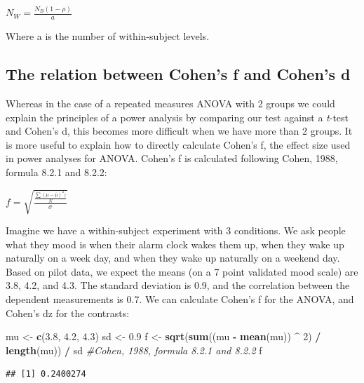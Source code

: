 \documentclass[]{book}
\newenvironment{Shaded}{\begin{snugshade}}{\end{snugshade}}
\newcommand{\CommentTok}[1]{\textcolor[rgb]{0.56,0.35,0.01}{\textit{#1}}}
\newcommand{\DecValTok}[1]{\textcolor[rgb]{0.00,0.00,0.81}{#1}}
\newcommand{\FloatTok}[1]{\textcolor[rgb]{0.00,0.00,0.81}{#1}}
\newcommand{\KeywordTok}[1]{\textcolor[rgb]{0.13,0.29,0.53}{\textbf{#1}}}
\newcommand{\NormalTok}[1]{#1}
\newcommand{\OperatorTok}[1]{\textcolor[rgb]{0.81,0.36,0.00}{\textbf{#1}}}
\newcommand{\StringTok}[1]{\textcolor[rgb]{0.31,0.60,0.02}{#1}}
\begin{document}
\(N_{W}=\frac{N_{B}(1-\rho)}{a}\)

Where a is the number of within-subject levels.

\hypertarget{the-relation-between-cohens-f-and-cohens-d}{%
\subsection{The relation between Cohen's f and Cohen's d}\label{the-relation-between-cohens-f-and-cohens-d}}

Whereas in the case of a repeated measures ANOVA with 2 groups we could explain the principles of a power analysis by comparing our test against a \emph{t}-test and Cohen's d, this becomes more difficult when we have more than 2 groups. It is more useful to explain how to directly calculate Cohen's f, the effect size used in power analyses for ANOVA. Cohen's f is calculated following Cohen, 1988, formula 8.2.1 and 8.2.2:

\(f = \sqrt{\frac{\frac{\sum(\mu-\overline{\mu})^2)}N}\sigma}\)

Imagine we have a within-subject experiment with 3 conditions. We ask people what they mood is when their alarm clock wakes them up, when they wake up naturally on a week day, and when they wake up naturally on a weekend day. Based on pilot data, we expect the means (on a 7 point validated mood scale) are 3.8, 4.2, and 4.3. The standard deviation is 0.9, and the correlation between the dependent measurements is 0.7. We can calculate Cohen's f for the ANOVA, and Cohen's dz for the contrasts:

\begin{Shaded}
\begin{Highlighting}[]
\NormalTok{mu <-}\StringTok{ }\KeywordTok{c}\NormalTok{(}\FloatTok{3.8}\NormalTok{, }\FloatTok{4.2}\NormalTok{, }\FloatTok{4.3}\NormalTok{)}
\NormalTok{sd <-}\StringTok{ }\FloatTok{0.9}
\NormalTok{f <-}\StringTok{ }\KeywordTok{sqrt}\NormalTok{(}\KeywordTok{sum}\NormalTok{((mu }\OperatorTok{-}\StringTok{ }\KeywordTok{mean}\NormalTok{(mu)) }\OperatorTok{^}\StringTok{ }\DecValTok{2}\NormalTok{) }\OperatorTok{/}\StringTok{ }\KeywordTok{length}\NormalTok{(mu)) }\OperatorTok{/}\StringTok{ }\NormalTok{sd }
\CommentTok{#Cohen, 1988, formula 8.2.1 and 8.2.2}
\NormalTok{  f}
\end{Highlighting}
\end{Shaded}

\begin{verbatim}
## [1] 0.2400274
\end{verbatim}
\end{document}
